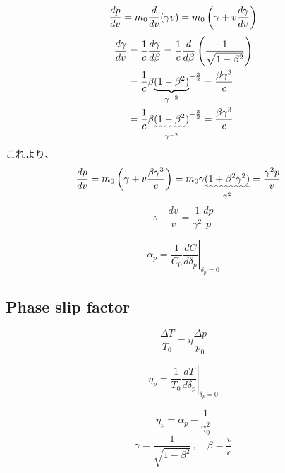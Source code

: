 \documentclass[10pt,a4paper]{ltjsarticle}
\begin{document}
\begin{tcolorbox}[title=式 (\ref{delta_v}) の導出]
    \begin{equation}
        \frac{dp}{dv} = m_0\frac{d}{dv}(\gamma v)
        = m_0 \left(\gamma + v \frac{d\gamma}{dv}\right) \notag
    \end{equation}
    \begin{align}
        \frac{d\gamma}{dv} & = \frac{1}{c}\frac{d\gamma}{d\beta}= \frac{1}{c}\frac{d}{d\beta}\left(\frac{1}{\sqrt{1-\beta^2}}\right) \notag \\
        & = \frac{1}{c} \beta \underset{\gamma^{-2}}{\underbrace{(1-\beta^2)}}^{-\frac{3}{2}} = \frac{\beta \gamma^3}{c} \notag \\
        & = \frac{1}{c} \beta \underset{\gamma^{-2}}{\uwave{(1-\beta^2)}}^{-\frac{3}{2}} = \frac{\beta \gamma^3}{c} \notag
    \end{align}
    これより、
    \begin{align}
        \frac{dp}{dv} & = m_0 \left(\gamma + v \frac{\beta \gamma^3}{c}\right)
        = m_0 \gamma \underset{\gamma^2}{\uwave{(1 + \beta^2 \gamma^2)}}
        = \frac{\gamma^2 p}{v} \notag
    \end{align}
    \begin{equation}
        \therefore \quad \frac{dv}{v} = \frac{1}{\gamma^2}\frac{dp}{p} \tag{B.1}
    \end{equation}
\end{tcolorbox}
%
\begin{equation}
    \alpha_p = \frac{1}{C_0}\left.\frac{dC}{d\delta_p}\right|_{\delta_p = 0}
\end{equation}
%
\subsection{Phase slip factor}
\begin{equation}
    \frac{\Delta T}{T_0}=\eta\frac{\Delta p}{p_0}
    \label{slip}
\end{equation}

\begin{equation}
    \eta_p = \frac{1}{T_0}\left. \frac{dT}{d\delta_p}\right|_{\delta_p = 0}
\end{equation}

\begin{equation}
    \eta_p=\alpha_p - \frac{1}{\gamma_0^2}
    \label{alppha_slip}
\end{equation}
\begin{equation}
    \gamma = \frac{1}{\sqrt{1-\beta^2}}\, , \quad \beta = \frac{v}{c}
\end{equation}
\end{document}
